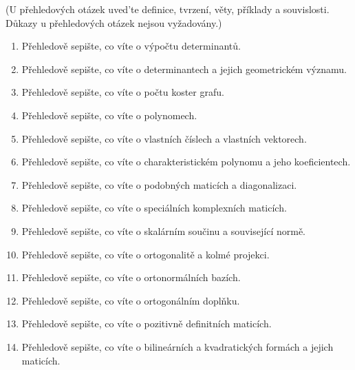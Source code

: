 \documentclass[10pt,a4paper]{article}
\theoremstyle{plain}
\begin{document}
(U přehledových otázek uved'te definice, tvrzení, věty, příklady a souvislosti. Důkazy u přehledových otázek nejsou vyžadovány.)
\begin{enumerate}
\item Přehledově sepište, co víte o výpočtu determinantů.
\item Přehledově sepište, co víte o determinantech a jejich geometrickém významu.
\item Přehledově sepište, co víte o počtu koster grafu.
\item Přehledově sepište, co víte o polynomech.
\item Přehledově sepište, co víte o vlastních číslech a vlastních vektorech.
\item Přehledově sepište, co víte o charakteristickém polynomu a jeho koeficientech.
\item Přehledově sepište, co víte o podobných maticích a diagonalizaci.
\item Přehledově sepište, co víte o speciálních komplexních maticích.
\item Přehledově sepište, co víte o skalárním součinu a související normě.
\item Přehledově sepište, co víte o ortogonalitě a kolmé projekci.
\item Přehledově sepište, co víte o ortonormálních bazích.
\item Přehledově sepište, co víte o ortogonálním doplňku.
\item Přehledově sepište, co víte o pozitivně definitních maticích.
\item Přehledově sepište, co víte o bilineárních a kvadratických formách a jejich maticích.
\end{enumerate}
\end{document}
